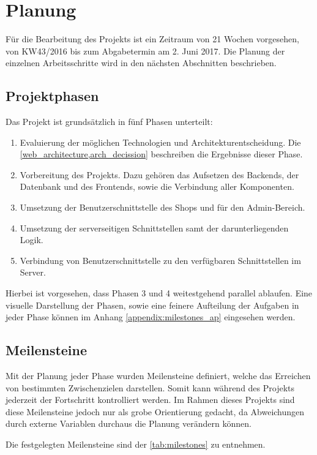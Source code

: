 \section{Planung} \thispagestyle{nomarkstyle}
Für die Bearbeitung des Projekts ist ein Zeitraum von 21 Wochen vorgesehen, von KW43/2016 bis zum Abgabetermin am 2. Juni 2017.
Die Planung der einzelnen Arbeitsschritte wird in den nächsten Abschnitten beschrieben.

\subsection{Projektphasen}
Das Projekt ist grundsätzlich in fünf Phasen unterteilt:
\begin{enumerate}
	\item Evaluierung der möglichen Technologien und Architekturentscheidung. Die \cref{web_architecture,arch_decission} beschreiben die Ergebnisse dieser Phase.
	\item Vorbereitung des Projekts. Dazu gehören das Aufsetzen des Backends, der Datenbank und des Frontends, sowie die Verbindung aller Komponenten.
	\item Umsetzung der Benutzerschnittstelle des Shops und für den Admin-Bereich.
	\item Umsetzung der serverseitigen Schnittstellen samt der darunterliegenden Logik.
	\item Verbindung von Benutzerschnittstelle zu den verfügbaren Schnittstellen im Server.
\end{enumerate}

Hierbei ist vorgesehen, dass Phasen 3 und 4 weitestgehend parallel ablaufen. Eine visuelle Darstellung der Phasen, sowie eine feinere Aufteilung der Aufgaben in jeder Phase können im Anhang \ref{appendix:milestones_ap} eingesehen werden.

\subsection{Meilensteine}
Mit der Planung jeder Phase wurden Meilensteine definiert, welche das Erreichen von bestimmten Zwischenzielen darstellen. Somit kann während des Projekts jederzeit der Fortschritt kontrolliert werden.
Im Rahmen dieses Projekts sind diese Meilensteine jedoch nur als grobe Orientierung gedacht, da Abweichungen durch externe Variablen durchaus die Planung verändern können.

Die festgelegten Meilensteine sind der \cref{tab:milestones} zu entnehmen.

